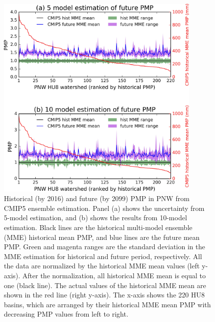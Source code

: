 \begin{figure}[htbp]
	\centering
	\includegraphics[width=10cm]{pics/ch5/fig9.jpg}
	\caption{Historical (by 2016) and future (by 2099) PMP in PNW from CMIP5 ensemble estimation. Panel (a) shows the uncertainty from 5-model estimation, and (b) shows the results from 10-model estimation. Black lines are the historical multi-model ensemble (MME) historical mean PMP, and blue lines are the future mean PMP. Green and magenta ranges are the standard deviation in the MME estimation for historical and future period, respectively. All the data are normalized by the historical MME mean values (left y-axis). After the normalization, all historical MME mean is equal to one (black line). The actual values of the historical MME mean are shown in the red line (right y-axis). The x-axis shows the 220 HU8 basins, which are arranged by their historical MME mean PMP with decreasing PMP values from left to right.}
	\label{fig:5-9}
\end{figure}

